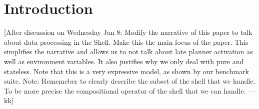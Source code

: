 \documentclass[acmsmall,10pt,review,anonymous]{acmart}
\newcommand{\kk}[1]{[{\color{magenta}#1 --- kk}]}
\begin{document}




\maketitle


\section{Introduction}
\label{intro}

\kk{After discussion on Wednesday Jan 8: Modify the narrative of this paper to talk about data processing in the Shell. Make this the main focus of the paper. This simplifies the narrative and allows us to not talk about late planner activation as well as environment variables. It also justifies why we only deal with pure and stateless. Note that this is a very expressive model, as shown by our benchmark suite. Note: Rememeber to clearly describe the subset of the shell that we handle. To be more precise the compositional operator of the shell that we can handle.}

% 
\end{document}
